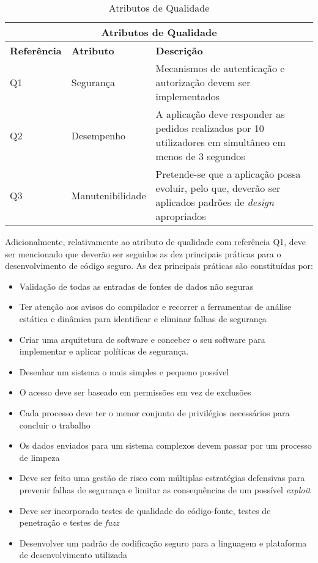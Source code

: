 \begin{table}[H]
\caption{Atributos de Qualidade}
\label{table:qualidades}
\begin{center}
\begin{tabular}{ |p{3cm}|p{3cm}|p{6cm}|  }
\hline
\multicolumn{3}{|c|}{Atributos de Qualidade} \\
\hline
\textbf{Referência} & \textbf{Atributo} & \textbf{Descrição} \\
\hline
Q1 & Segurança & Mecanismos de autenticação e autorização devem ser implementados\\
\hline
Q2 & Desempenho & A aplicação deve responder as pedidos realizados por 10 utilizadores em simultâneo em menos de 3 segundos\\
\hline
Q3 & Manutenibilidade & Pretende-se que a aplicação possa evoluir, pelo que, deverão ser aplicados padrões de \textit{design} apropriados\\
\hline
\end{tabular} 
\end{center}
\end{table}

Adicionalmente, relativamente ao atributo de qualidade com referência Q1, deve ser mencionado que deverão ser seguidos as dez principais práticas para o desenvolvimento de código seguro. As dez principais práticas são constituídas por:
\begin{itemize}
    \item Validação de todas as entradas de fontes de dados não seguras \cite{top10}
    \item Ter atenção aos avisos do compilador e recorrer a ferramentas de análise estática e dinâmica para identificar e eliminar falhas de segurança \cite{top10}
    \item Criar uma arquitetura de software e conceber o seu software para implementar e aplicar políticas de segurança. \cite{top10}
    \item Desenhar um sistema o mais simples e pequeno possível \cite{top10}
    \item O acesso deve ser baseado em permissões em vez de exclusões \cite{top10}
    \item Cada processo deve ter o menor conjunto de privilégios necessários para concluir o trabalho \cite{top10}
    \item Os dados enviados para um sistema complexos devem passar por um processo de limpeza \cite{top10}
    \item Deve ser feito uma gestão de risco com múltiplas estratégias defensivas para prevenir falhas de segurança e limitar as consequências de um possível \textit{exploit} \cite{top10}
    \item Deve ser incorporado testes de qualidade do código-fonte, testes de penetração e testes de \textit{fuzz} \cite{top10}
    \item Desenvolver um padrão de codificação seguro para a linguagem e plataforma de desenvolvimento utilizada \cite{top10}
\end{itemize}








